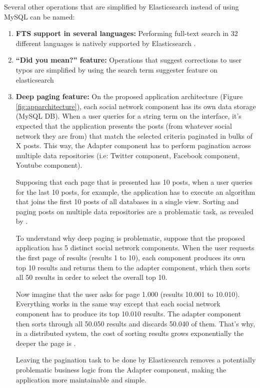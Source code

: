 Several other operations that are simplified by Elasticsearch instead of using MySQL can be named: 
\begin{enumerate}
\item{\textbf{FTS support in several languages:} Performing full-text search in 32 different languages is natively supported by Elasticsearch \cite{eslanguageanalyzers}.}
\item{\textbf{``Did you mean?'' feature:} Operations that suggest corrections to user typos are simplified by using the search term suggester feature on elasticsearch\cite{termsuggester}}
\item{\textbf{Deep paging feature:} On the proposed application architecture (Figure \ref{fig:apparchitecture}), each social network component has its own data storage (MySQL DB). When a user queries for a string term on the interface, it's expected that the application presents the posts (from whatever social network they are from) that match the selected criteria paginated in bulks of X posts. This way, the Adapter component has to perform pagination across multiple data repositories (i.e: Twitter component, Facebook component, Youtube component). 

Supposing that each page that is presented has 10 posts, when a user queries for the last 10 posts, for example, the application has to execute an algorithm that joins the first 10 posts of all databases in a single view. Sorting and paging posts on multiple data repositories are a problematic task, as revealed by \cite{paginationES}.

To understand why deep paging is problematic, suppose that the proposed application has 5 distinct social network components. When the user requests the first page of results (results 1 to 10), each component produces its own top 10 results and returns them to the adapter component, which then sorts all 50 results in order to select the overall top 10.

Now imagine that the user asks for page 1.000 (results 10.001 to 10.010). Everything works in the same way except that each social network component has to produce its top 10.010 results. The adapter component then sorts through all 50.050 results and discards 50.040 of them. That's why, in a distributed system, the cost of sorting results grows exponentially the deeper the page is \cite{paginationES}.

Leaving the pagination task to be done by Elasticsearch removes a potentially problematic business logic from the Adapter component, making the application more maintainable and simple.

}

\end{enumerate}

